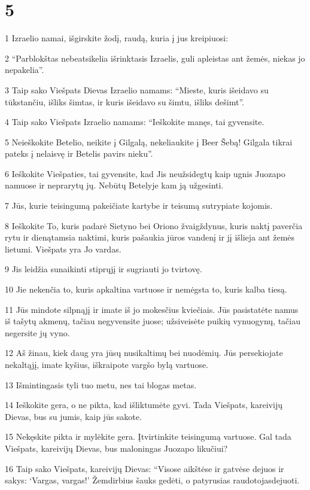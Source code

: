 \chapter{5}


\par 1 Izraelio namai, išgirskite žodį, raudą, kuria į jus kreipiuosi: 
\par 2 “Parblokštas nebeatsikelia išrinktasis Izraelis, guli apleistas ant žemės, niekas jo nepakelia”. 
\par 3 Taip sako Viešpats Dievas Izraelio namams: “Mieste, kuris išeidavo su tūkstančiu, išliks šimtas, ir kuris išeidavo su šimtu, išliks dešimt”. 
\par 4 Taip sako Viešpats Izraelio namams: “Ieškokite manęs, tai gyvensite. 
\par 5 Neieškokite Betelio, neikite į Gilgalą, nekeliaukite į Beer Šebą! Gilgala tikrai pateks į nelaisvę ir Betelis pavirs nieku”. 
\par 6 Ieškokite Viešpaties, tai gyvensite, kad Jis neužsidegtų kaip ugnis Juozapo namuose ir neprarytų jų. Nebūtų Betelyje kam ją užgesinti. 
\par 7 Jūs, kurie teisingumą pakeičiate kartybe ir teisumą sutrypiate kojomis. 
\par 8 Ieškokite To, kuris padarė Sietyno bei Oriono žvaigždynus, kuris naktį paverčia rytu ir dieną­tamsia naktimi, kuris pašaukia jūros vandenį ir jį išlieja ant žemės lietumi. Viešpats yra Jo vardas. 
\par 9 Jis leidžia sunaikinti stiprųjį ir sugriauti jo tvirtovę. 
\par 10 Jie nekenčia to, kuris apkaltina vartuose ir nemėgsta to, kuris kalba tiesą. 
\par 11 Jūs mindote silpnąjį ir imate iš jo mokesčius kviečiais. Jūs pasistatėte namus iš tašytų akmenų, tačiau negyvensite juose; užsiveisėte puikių vynuogynų, tačiau negersite jų vyno. 
\par 12 Aš žinau, kiek daug yra jūsų nusikaltimų bei nuodėmių. Jūs persekiojate nekaltąjį, imate kyšius, iškraipote vargšo bylą vartuose. 
\par 13 Išmintingasis tyli tuo metu, nes tai blogas metas. 
\par 14 Ieškokite gera, o ne pikta, kad išliktumėte gyvi. Tada Viešpats, kareivijų Dievas, bus su jumis, kaip jūs sakote. 
\par 15 Nekęskite pikta ir mylėkite gera. Įtvirtinkite teisingumą vartuose. Gal tada Viešpats, kareivijų Dievas, bus maloningas Juozapo likučiui? 
\par 16 Taip sako Viešpats, kareivijų Dievas: “Visose aikštėse ir gatvėse dejuos ir sakys: ‘Vargas, vargas!’ Žemdirbius šauks gedėti, o patyrusias raudotojas­dejuoti. 
